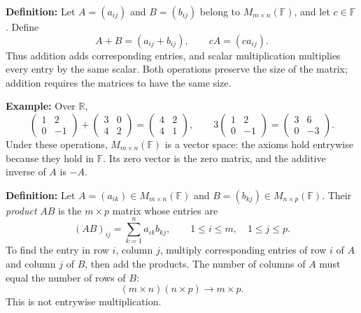 \documentclass[a4paper,11pt,abstract=true]{scrartcl}
\theoremstyle{dotlessP}
\theoremstyle{dotlessS}
\theoremstyle{remark}
\theoremstyle{definition}
\begin{document}
\begin{claim_box}
\textbf{Definition:} Let
$A=(a_{ij})$ and $B=(b_{ij})$ belong to
$M_{m\times n}(\mathbb{F})$, and let $c\in\mathbb{F}$. Define
\[
A+B=(a_{ij}+b_{ij}),\qquad cA=(ca_{ij}).
\]
Thus addition adds corresponding entries, and scalar multiplication
multiplies every entry by the same scalar. Both operations preserve the
size of the matrix; addition requires the matrices to have the same size.
\end{claim_box}

\begin{example_box}
\textbf{Example:} Over $\mathbb{R}$,
\[
\begin{pmatrix}1&2\\0&-1\end{pmatrix}
+\begin{pmatrix}3&0\\4&2\end{pmatrix}
=\begin{pmatrix}4&2\\4&1\end{pmatrix},
\qquad
3\begin{pmatrix}1&2\\0&-1\end{pmatrix}
=\begin{pmatrix}3&6\\0&-3\end{pmatrix}.
\]
Under these operations, $M_{m\times n}(\mathbb{F})$ is a vector space:
the axioms hold entrywise because they hold in $\mathbb{F}$. Its zero
vector is the zero matrix, and the additive inverse of $A$ is $-A$.
\end{example_box}

\begin{definition_box}
\textbf{Definition:} Let
$A=(a_{ik})\in M_{m\times n}(\mathbb{F})$ and
$B=(b_{kj})\in M_{n\times p}(\mathbb{F})$. Their \emph{product}
$AB$ is the $m\times p$ matrix whose entries are
\[
{(AB)}_{ij}=\sum_{k=1}^n a_{ik}b_{kj},
\qquad 1\leq i\leq m,\quad 1\leq j\leq p.
\]
To find the entry in row $i$, column $j$, multiply corresponding entries
of row $i$ of $A$ and column $j$ of $B$, then add the products.
The number of columns of $A$ must equal the number of rows of $B$:
\[
(m\times n)(n\times p)\longrightarrow m\times p.
\]
This is not entrywise multiplication.
\end{definition_box}
\end{document}
